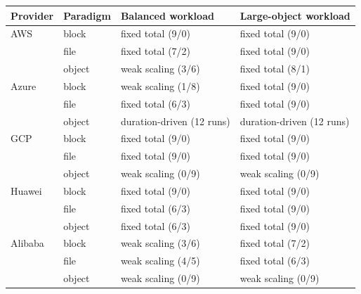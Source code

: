 \begin{tabular}{llll}
\toprule
Provider & Paradigm & Balanced workload & Large-object workload \\
\midrule
AWS & block & fixed total (9/0) & fixed total (9/0) \\
 & file & fixed total (7/2) & fixed total (9/0) \\
 & object & weak scaling (3/6) & fixed total (8/1) \\
Azure & block & weak scaling (1/8) & fixed total (9/0) \\
 & file & fixed total (6/3) & fixed total (9/0) \\
 & object & duration-driven (12 runs) & duration-driven (12 runs) \\
GCP & block & fixed total (9/0) & fixed total (9/0) \\
 & file & fixed total (9/0) & fixed total (9/0) \\
 & object & weak scaling (0/9) & weak scaling (0/9) \\
Huawei & block & fixed total (9/0) & fixed total (9/0) \\
 & file & fixed total (6/3) & fixed total (9/0) \\
 & object & fixed total (6/3) & fixed total (9/0) \\
Alibaba & block & weak scaling (3/6) & fixed total (7/2) \\
 & file & weak scaling (4/5) & fixed total (6/3) \\
 & object & weak scaling (0/9) & weak scaling (0/9) \\
\bottomrule
\end{tabular}
